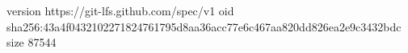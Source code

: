 version https://git-lfs.github.com/spec/v1
oid sha256:43a4f0432102271824761795d8aa36acc77e6c467aa820dd826ea2e9c3432bdc
size 87544
